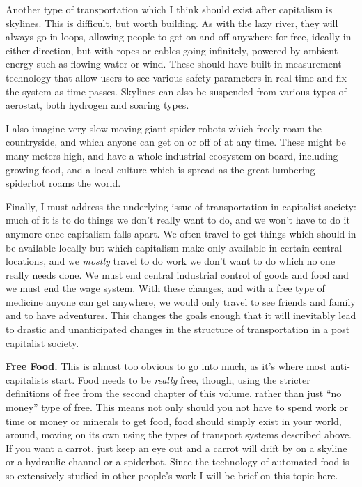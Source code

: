 Another type of transportation which I think should exist after
capitalism is skylines. This is difficult, but worth building. As with
the lazy river, they will always go in loops, allowing people to get on
and off anywhere for free, ideally in either direction, but with ropes
or cables going infinitely, powered by ambient energy such as flowing
water or wind. These should have built in measurement technology that
allow users to see various safety parameters in real time and fix the
system as time passes. Skylines can also be suspended from various types
of aerostat, both hydrogen and soaring types.

I also imagine very slow moving giant spider robots which freely roam
the countryside, and which anyone can get on or off of at any time.
These might be many meters high, and have a whole industrial ecosystem
on board, including growing food, and a local culture which is spread as
the great lumbering spiderbot roams the world.

Finally, I must address the underlying issue of transportation in
capitalist society: much of it is to do things we don't really want to
do, and we won't have to do it anymore once capitalism falls apart. We
often travel to get things which should in be available locally but
which capitalism make only available in certain central locations, and
we \emph{mostly} travel to do work we don't want to do which no one
really needs done. We must end central industrial control of goods and
food and we must end the wage system. With these changes, and with a
free type of medicine anyone can get anywhere, we would only travel to
see friends and family and to have adventures. This changes the goals
enough that it will inevitably lead to drastic and unanticipated changes
in the structure of transportation in a post capitalist society.

\textbf{Free Food.} This is almost too obvious to go into much, as it's
where most anti-capitalists start. Food needs to be \emph{really} free,
though, using the stricter definitions of free from the second chapter
of this volume, rather than just ``no money'' type of free. This means
not only should you not have to spend work or time or money or minerals
to get food, food should simply exist in your world, around, moving on
its own using the types of transport systems described above. If you
want a carrot, just keep an eye out and a carrot will drift by on a
skyline or a hydraulic channel or a spiderbot. Since the technology of
automated food is so extensively studied in other people's work I will
be brief on this topic here.

